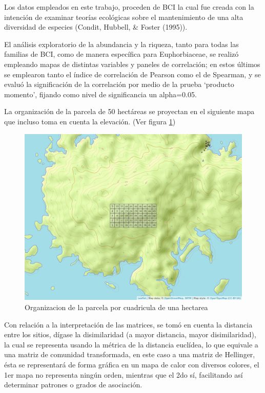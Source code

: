 \documentclass[11pt,]{article}
\begin{document}
Los datos empleados en este trabajo, proceden de BCI la cual fue creada
con la intención de examinar teorías ecológicas sobre el mantenimiento
de una alta diversidad de especies (Condit, Hubbell, \& Foster (1995)).

El análisis exploratorio de la abundancia y la riqueza, tanto para todas
las familias de BCI, como de manera específica para Euphorbiaceae, se
realizó empleando mapas de distintas variables y paneles de correlación;
en estos últimos se emplearon tanto el índice de correlación de Pearson
como el de Spearman, y se evaluó la significación de la correlación por
medio de la prueba `producto momento', fijando como nivel de
significancia un alpha=0.05.

La organización de la parcela de 50 hectáreas se proyectan en el
siguiente mapa que incluso toma en cuenta la elevación. (Ver figura
\ref{fig:mapa_cuadros})

\begin{figure}
\centering
\includegraphics{mapa_cuadros.png}
\caption{\label{fig:mapa_cuadros}Organizacion de la parcela por
cuadricula de una hectarea}
\end{figure}

Con relación a la interpretación de las matrices, se tomó en cuenta la
distancia entre los sitios, dígase la disimilaridad (a mayor distancia,
mayor disimilaridad), la cual se representa usando la métrica de la
distancia euclídea, lo que equivale a una matriz de comunidad
transformada, en este caso a una matriz de Hellinger, ésta se
representará de forma gráfica en un mapa de calor con diversos colores,
el 1er mapa no representa ningún orden, mientras que el 2do sí,
facilitando así determinar patrones o grados de asociación.
\end{document}
